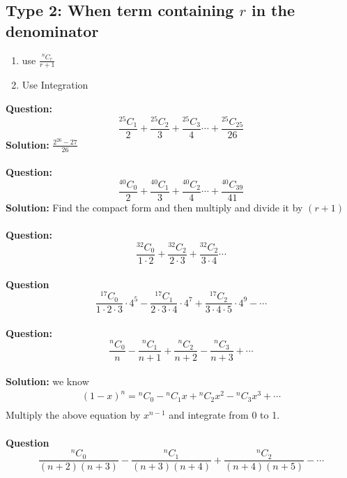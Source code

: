 \documentclass[12pt]{article}
\begin{document}
\subsection{Type 2: When term containing $r$ in the denominator}
\begin{enumerate}
    \item use $\frac{{}^{n}C_{r}}{r+1}$
    \item Use Integration
\end{enumerate}
\textbf{Question:} \[
\frac{{}^{25}C_{1}}{2}+\frac{{}^{25}C_{2}}{3}+\frac{{}^{25}C_{3}}{4}\cdots+\frac{{}^{25}C_{25}}{26}
\]
\textbf{Solution: }$\frac{2^{26}-27}{26}$ \\
\\
\textbf{Question: }\[
\frac{{}^{40}C_{0}}{2}+\frac{{}^{40}C_{1}}{3}+\frac{{}^{40}C_{2}}{4}\cdots+\frac{{}^{40}C_{39}}{41}
\]
\textbf{Solution: } Find the compact form and then multiply and divide it by $(r+1)$  \\
\\
\textbf{Question: }
\[
\frac{{}^{32}C_{0}}{1\cdot2}+\frac{{}^{32}C_{2}}{2 \cdot3}+\frac{{}^{32}C_{2}}{3\cdot4}\cdots
\]
\\
\textbf{Question}\[
\frac{{}^{17}C_{0}}{1\cdot 2\cdot 3}\cdot 4^5-\frac{{}^{17}C_{1}}{2\cdot 3\cdot 4}\cdot 4^7+\frac{{}^{17}C_{2}}{3\cdot 4\cdot 5}\cdot 4^9- \cdots
\]
\\
\textbf{Question: }\[
\frac{{}^{n}C_{0}}{n}-\frac{{}^{n}C_{1}}{n+1}+\frac{{}^{n}C_{2}}{n+2}-\frac{{}^{n}C_{3}}{n+3}+\cdots
\]\\
\textbf{Solution: }
we know
\[
\begin{aligned}
    (1-x)^n = {}^{n}C_{0}
    - {}^{n}C_{1}x
    + {}^{n}C_{2}x^2
    - {}^{n}C_{3}x^3
    + \cdots \\
\end{aligned}
\]
Multiply the above equation by $x^{n-1}$ and integrate from 0 to 1. \\ 
\\
\textbf{Question} \[
\frac{{}^{n}C_{0}}{(n+2)(n+3)}-\frac{{}^{n}C_{1}}{(n+3)(n+4)}
+\frac{{}^{n}C_{2}}{(n+4)(n+5)}-\cdots
\] \\
\newpage
\end{document}
